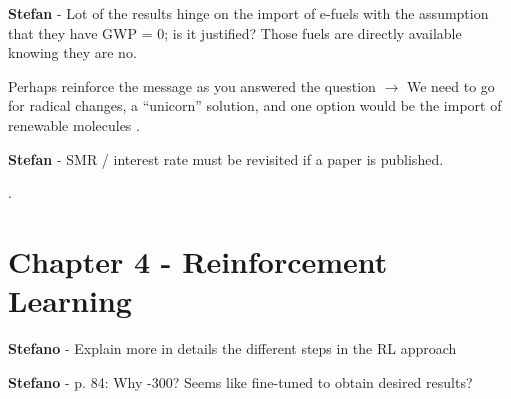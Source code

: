 \documentclass[12pt,a4paper]{article}
\begin{document}
\begin{mdframed}[style=comment] %
{\color{teal} \textbf{Stefan}} - Lot of the results hinge on the import of e-fuels with the assumption that they have GWP = 0; is it justified? Those fuels are directly available knowing they are no.
\end{mdframed}

\noindent Perhaps reinforce the message as you answered the question $\rightarrow$ We need to go for radical changes, a “unicorn” solution, and one option would be the import of renewable molecules {\color{blue} }. 

\begin{mdframed}[style=manuscript] %

\end{mdframed}



\begin{mdframed}[style=comment] %
{\color{teal} \textbf{Stefan}} - SMR / interest rate must be revisited if a paper is published.
\end{mdframed}

\noindent {\color{blue} }. 

\begin{mdframed}[style=manuscript] %

\end{mdframed}

\section{Chapter 4 - Reinforcement Learning}
\label{Chap_RL}


\begin{mdframed}[style=comment] %
{\color{orange} \textbf{Stefano}} - Explain more in details the different steps in the RL approach
\end{mdframed}

\noindent 

\begin{mdframed}[style=manuscript] %

\end{mdframed}

\begin{mdframed}[style=comment] %
{\color{orange} \textbf{Stefano}} - p. 84: Why -300? Seems like fine-tuned to obtain desired results?
\end{mdframed}
\end{document}
